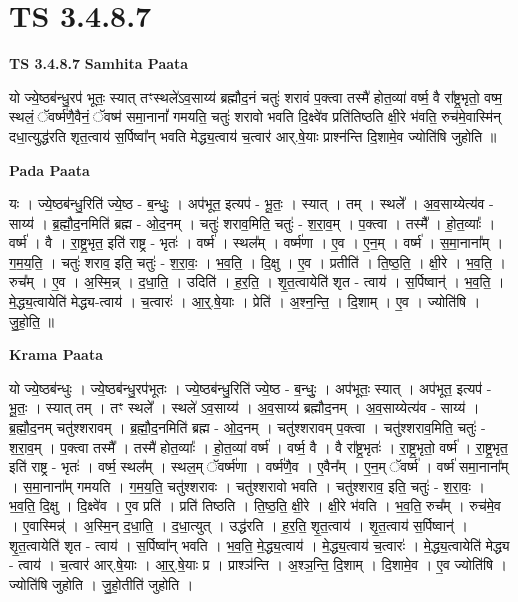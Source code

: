 \documentclass[17pt]{extarticle}
\begin{document}
\section{ TS 3.4.8.7 }

\textbf{TS 3.4.8.7 } \newline
\textbf{Samhita Paata} \newline

यो ज्ये॒ष्ठब॑न्धु॒रप॑ भूतः॒ स्यात् तꣳस्थले॑ऽव॒साय्य॑ ब्रह्मौद॒नं चतुः॑ शरावं प॒क्त्वा तस्मै॑ होत॒व्या॑ वर्ष्म॒ वै रा᳚ष्ट्र॒भृतो॒ वष्म॒ स्थलं॒ ॅवर्ष्म॑णै॒वैनं॒ ॅवष्म॑ समा॒नानां᳚ गमयति॒ चतुः॑ शरावो भवति दि॒क्ष्वे॑व प्रति॑तिष्ठति क्षी॒रे भ॑वति॒ रुच॑मे॒वास्मि॑न् दधा॒त्युद्ध॑रति शृत॒त्वाय॑ स॒र्पिष्वा᳚न् भवति मेद्ध्य॒त्वाय॑ च॒त्वार॑ आर्.षे॒याः प्राश्न॑न्ति दि॒शामे॒व ज्योति॑षि जुहोति ॥ \newline

\textbf{Pada Paata} \newline

यः । ज्ये॒ष्ठब॑न्धु॒रिति॑ ज्ये॒ष्ठ - ब॒न्धुः॒ । अप॑भूत॒ इत्यप॑ - भू॒तः॒ । स्यात् । तम् । स्थले᳚ । अ॒व॒साय्येत्य॑व - साय्य॑ । ब्र॒ह्मौ॒द॒नमिति॑ ब्रह्म - ओ॒द॒नम् । चतुः॑ शराव॒मिति॒ चतुः॑ - श॒रा॒व॒म् । प॒क्त्वा । तस्मै᳚ । हो॒त॒व्याः᳚ । वर्ष्म॑ । वै । रा॒ष्ट्र॒भृत॒ इति॑ राष्ट्र - भृतः॑ । वर्ष्म॑ । स्थल᳚म् । वर्ष्म॑णा । ए॒व । ए॒न॒म् । वर्ष्म॑ । स॒मा॒नाना᳚म् । ग॒म॒य॒ति॒ । चतुः॑ शराव॒ इति॒ चतुः॑ - श॒रा॒वः॒ । भ॒व॒ति॒ । दि॒क्षु । ए॒व । प्रतीति॑ । ति॒ष्ठ॒ति॒ । क्षी॒रे । भ॒व॒ति॒ । रुच᳚म् । ए॒व । अ॒स्मि॒न्न् । द॒धा॒ति॒ । उदिति॑ । ह॒र॒ति॒ । शृ॒त॒त्वायेति॑ शृत - त्वाय॑ । स॒र्पिष्वान्॑ । भ॒व॒ति॒ । मे॒द्ध्य॒त्वायेति॑ मेद्ध्य-त्वाय॑ । च॒त्वारः॑ । आ॒र्॒.षे॒याः । प्रेति॑ । अ॒श्न॒न्ति॒ । दि॒शाम् । ए॒व । ज्योति॑षि । जु॒हो॒ति॒ ॥  \newline


\textbf{Krama Paata} \newline

यो ज्ये॒ष्ठब॑न्धुः । ज्ये॒ष्ठब॑न्धु॒रप॑भूतः । ज्ये॒ष्ठब॑न्धु॒रिति॑ ज्ये॒ष्ठ - ब॒न्धुः॒ । अप॑भूतः॒ स्यात् । अप॑भूत॒ इत्यप॑ - भू॒तः॒ । स्यात् तम् । तꣳ स्थले᳚ । स्थले॑ ऽव॒साय्य॑ । अ॒व॒साय्य॑ ब्रह्मौद॒नम् । अ॒व॒साय्येत्य॑व - साय्य॑ । ब्र॒ह्मौ॒द॒नम् चतु॑श्शरावम् । ब्र॒ह्मौ॒द॒नमिति॑ ब्रह्म - ओ॒द॒नम् । चतु॑श्शरावम् प॒क्त्वा । चतु॑श्शराव॒मिति॒ चतुः॑ - श॒रा॒व॒म् । प॒क्त्वा तस्मै᳚ । तस्मै॑ होत॒व्याः᳚ । हो॒त॒व्या॑ वर्ष्म॑ । वर्ष्म॒ वै । वै रा᳚ष्ट्र॒भृतः॑ । रा॒ष्ट्र॒भृतो॒ वर्ष्म॑ । रा॒ष्ट्र॒भृत॒ इति॑ राष्ट्र - भृतः॑ । वर्ष्म॒ स्थल᳚म् । स्थल॒म् ॅवर्ष्म॑णा । वर्ष्म॑णै॒व । ए॒वैन᳚म् । ए॒न॒म् ॅवर्ष्म॑ । वर्ष्म॑ समा॒नाना᳚म् । स॒मा॒नाना᳚म् गमयति । ग॒म॒य॒ति॒ चतु॑श्शरावः । चतु॑श्शरावो भवति । चतु॑श्शराव॒ इति॒ चतुः॑ - श॒रा॒वः॒ । भ॒व॒ति॒ दि॒क्षु । दि॒क्ष्वे॑व । ए॒व प्रति॑ । प्रति॑ तिष्ठति । ति॒ष्ठ॒ति॒ क्षी॒रे । क्षी॒रे भ॑वति । भ॒व॒ति॒ रुच᳚म् । रुच॑मे॒व । ए॒वास्मिन्न्॑ । अ॒स्मि॒न् द॒धा॒ति॒ । द॒धा॒त्युत् । उद्ध॑रति । ह॒र॒ति॒ शृ॒त॒त्वाय॑ । शृ॒त॒त्वाय॑ स॒र्पिष्वान्॑ । शृ॒त॒त्वायेति॑ शृत - त्वाय॑ । स॒र्पिष्वा᳚न् भवति । भ॒व॒ति॒ मे॒द्ध्य॒त्वाय॑ । मे॒द्ध्य॒त्वाय॑ च॒त्वारः॑ । मे॒द्ध्य॒त्वायेति॑ मेद्ध्य - त्वाय॑ । च॒त्वार॑ आर्.षे॒याः । आ॒र्॒.षे॒याः प्र । प्राश्ञ॑न्ति । अ॒श्ञ॒न्ति॒ दि॒शाम् । दि॒शामे॒व । ए॒व ज्योति॑षि । ज्योति॑षि जुहोति । जु॒हो॒तीति॑ जुहोति । \newline
\end{document}
